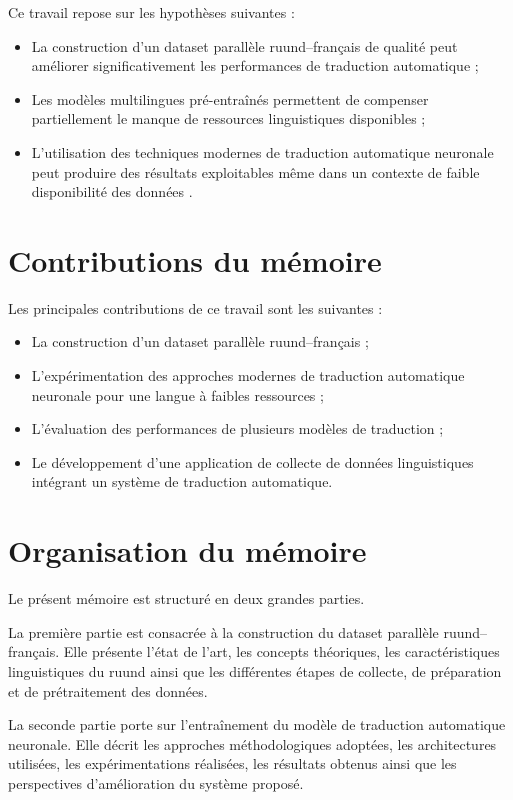 Ce travail repose sur les hypothèses suivantes :

\begin{itemize}
    \item La construction d'un dataset parallèle ruund--français de qualité peut améliorer significativement les performances de traduction automatique ;
    
    \item Les modèles multilingues pré-entraînés permettent de compenser partiellement le manque de ressources linguistiques disponibles ;
    
    \item L'utilisation des techniques modernes de traduction automatique neuronale peut produire des résultats exploitables même dans un contexte de faible disponibilité des données .
\end{itemize}

\section{Contributions du mémoire}

Les principales contributions de ce travail sont les suivantes :

\begin{itemize}
    \item La construction d'un dataset parallèle ruund--français ;
    
    \item L'expérimentation des approches modernes de traduction automatique neuronale pour une langue à faibles ressources ;
    
    \item L'évaluation des performances de plusieurs modèles de traduction ;
    
    \item Le développement d'une application de collecte de données linguistiques intégrant un système de traduction automatique.
\end{itemize}

\section{Organisation du mémoire}

Le présent mémoire est structuré en deux grandes parties.

La première partie est consacrée à la construction du dataset parallèle ruund--français. Elle présente l'état de l'art, les concepts théoriques, les caractéristiques linguistiques du ruund ainsi que les différentes étapes de collecte, de préparation et de prétraitement des données.

La seconde partie porte sur l'entraînement du modèle de traduction automatique neuronale. Elle décrit les approches méthodologiques adoptées, les architectures utilisées, les expérimentations réalisées, les résultats obtenus ainsi que les perspectives d'amélioration du système proposé.